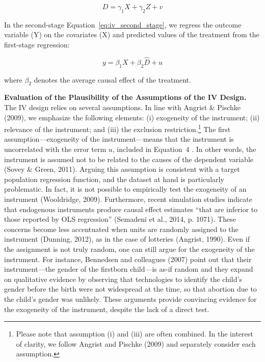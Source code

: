 \documentclass[english]{article}
\begin{document}
\begin{equation}
	D = \gamma_{1} X + \gamma_{2} Z + v 
	\label{eq:iv_first_stage}
\end{equation}

In the second-stage Equation~\ref{eq:iv_second_stage}, we regress the outcome
variable (Y) on the covariates (X) and predicted values of the treatment from
the first-stage regression: 

\begin{equation}
	y = \beta_{1} X + \beta_{2} \widehat{D} + u
	\label{eq:iv_second_stage}
\end{equation}

\noindent where $\beta_{2}$ denotes the average causal effect
of the treatment.

\noindent \textbf{Evaluation of the Plausibility  of the Assumptions of the IV
Design.} The IV design relies on several assumptions. In line with Angrist \&
Pischke (2009), we emphasize the following elements: (i) exogeneity of
the instrument; (ii) relevance of the instrument; and (iii) the
exclusion restriction.\footnote{Please note that assumption (i) and
  (iii) are often combined. In the interest of clarity, we follow
  Angrist and Pischke (2009) and separately consider each assumption.}
The first assumption---exogeneity of the instrument---means that the
instrument is uncorrelated with the error term \(u\), included in
Equation~4 . In other words, the instrument is assumed not to be related
to the causes of the dependent variable (Sovey \& Green, 2011). Arguing
this assumption is consistent with a target population regression
function, and the dataset at hand is particularly problematic. In fact,
it is not possible to empirically test the exogeneity of an instrument
(Wooldridge, 2009). Furthermore, recent simulation studies indicate that
endogenous instruments produce causal effect estimates ``that are
inferior to those reported by OLS regression'' (Semadeni et al., 2014,
p. 1071). These concerns become less accentuated when units are randomly
assigned to the instrument (Dunning, 2012), as in the case of lotteries
(Angrist, 1990). Even if the assignment is not truly random, one can
still argue for the exogeneity of the instrument. For instance,
Bennedsen and colleagues (2007) point out that their instrument---the
gender of the firstborn child---is as-if random and they expand on
qualitative evidence by observing that technologies to identify the
child's gender before the birth were not widespread at the time, so that
abortion due to the child's gender was unlikely. These arguments provide
convincing evidence for the exogeneity of the instrument, despite the
lack of a direct test.
\end{document}
